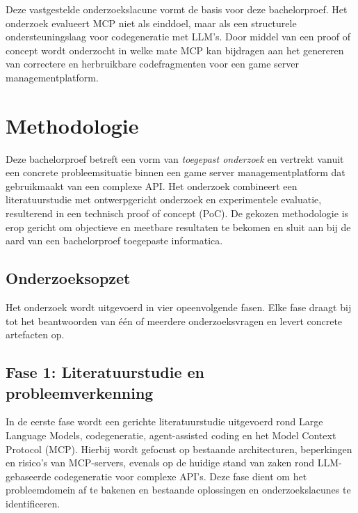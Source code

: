 Deze vastgestelde onderzoekslacune vormt de basis voor deze bachelorproef. Het onderzoek evalueert MCP niet als einddoel, maar als een structurele ondersteuningslaag voor codegeneratie met LLM’s. Door middel van een proof of concept wordt onderzocht in welke mate MCP kan bijdragen aan het genereren van correctere en herbruikbare codefragmenten voor een game server managementplatform.



\section{Methodologie}
\label{sec:methodologie}

Deze bachelorproef betreft een vorm van \textit{toegepast onderzoek} en vertrekt vanuit een concrete probleemsituatie binnen een game server managementplatform dat gebruikmaakt van een complexe API. Het onderzoek combineert een literatuurstudie met ontwerpgericht onderzoek en experimentele evaluatie, resulterend in een technisch proof of concept (PoC). De gekozen methodologie is erop gericht om objectieve en meetbare resultaten te bekomen en sluit aan bij de aard van een bachelorproef toegepaste informatica.

\subsection{Onderzoeksopzet}

Het onderzoek wordt uitgevoerd in vier opeenvolgende fasen. Elke fase draagt bij tot het beantwoorden van één of meerdere onderzoeksvragen en levert concrete artefacten op.

\subsection{Fase 1: Literatuurstudie en probleemverkenning}

In de eerste fase wordt een gerichte literatuurstudie uitgevoerd rond Large Language Models, codegeneratie, agent-assisted coding en het Model Context Protocol (MCP). Hierbij wordt gefocust op bestaande architecturen, beperkingen en risico’s van MCP-servers, evenals op de huidige stand van zaken rond LLM-gebaseerde codegeneratie voor complexe API’s. Deze fase dient om het probleemdomein af te bakenen en bestaande oplossingen en onderzoekslacunes te identificeren.



